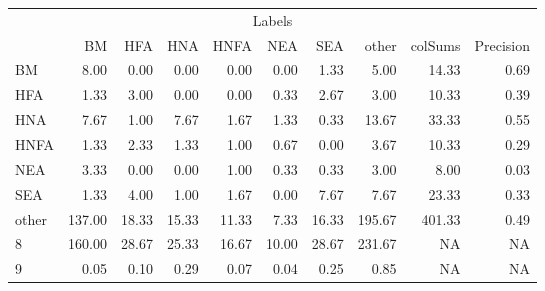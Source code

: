 \begin{table}
\centering\begingroup\fontsize{11}{13}\selectfont

\begin{tabular}{lrrrrrr>{}r|rr}
\toprule
\multicolumn{10}{c}{Labels} \\
\cmidrule(l{3pt}r{3pt}){1-10}
  & BM & HFA & HNA & HNFA & NEA & SEA & other & colSums & Precision\\
\midrule
BM & 8.00 & 0.00 & 0.00 & 0.00 & 0.00 & 1.33 & 5.00 & 14.33 & 0.69\\
HFA & 1.33 & 3.00 & 0.00 & 0.00 & 0.33 & 2.67 & 3.00 & 10.33 & 0.39\\
HNA & 7.67 & 1.00 & 7.67 & 1.67 & 1.33 & 0.33 & 13.67 & 33.33 & 0.55\\
HNFA & 1.33 & 2.33 & 1.33 & 1.00 & 0.67 & 0.00 & 3.67 & 10.33 & 0.29\\
NEA & 3.33 & 0.00 & 0.00 & 1.00 & 0.33 & 0.33 & 3.00 & 8.00 & 0.03\\
\addlinespace
SEA & 1.33 & 4.00 & 1.00 & 1.67 & 0.00 & 7.67 & 7.67 & 23.33 & 0.33\\
other & 137.00 & 18.33 & 15.33 & 11.33 & 7.33 & 16.33 & 195.67 & 401.33 & 0.49\\
8 & 160.00 & 28.67 & 25.33 & 16.67 & 10.00 & 28.67 & 231.67 & NA & NA\\
9 & 0.05 & 0.10 & 0.29 & 0.07 & 0.04 & 0.25 & 0.85 & NA & NA\\
\bottomrule
\end{tabular}
\endgroup{}
\end{table}
